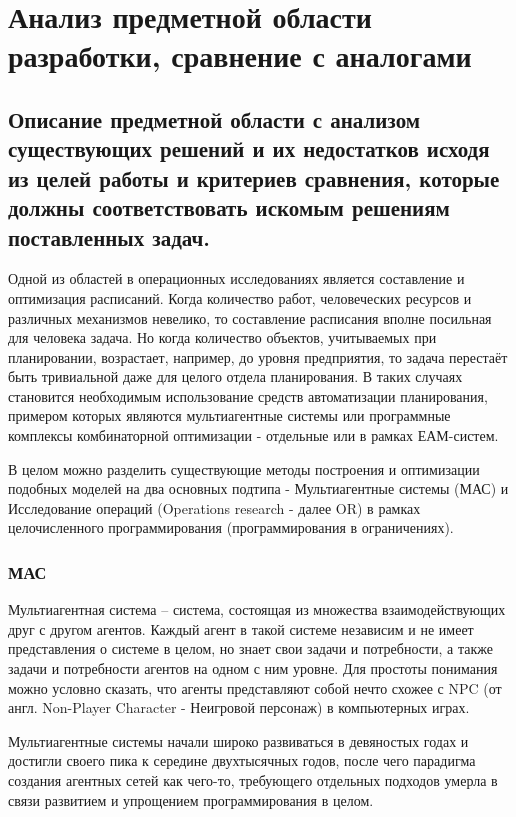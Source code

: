 \section{Анализ предметной области разработки, сравнение с аналогами}

\subsection{Описание предметной области с анализом существующих решений и их недостатков исходя из целей работы и критериев сравнения, которые должны соответствовать искомым решениям поставленных задач.}
Одной из областей в операционных исследованиях является составление и оптимизация расписаний. Когда количество работ, человеческих ресурсов и различных механизмов невелико, то составление расписания вполне посильная для человека задача. Но когда количество объектов, учитываемых при планировании, возрастает, например, до уровня предприятия, то задача перестаёт быть тривиальной даже для целого отдела планирования. В таких случаях становится необходимым использование средств автоматизации планирования, примером которых являются мультиагентные системы или программные комплексы комбинаторной оптимизации - отдельные или в рамках ЕАМ-систем.

В целом можно разделить существующие методы построения и оптимизации подобных моделей на два основных подтипа - Мультиагентные системы (МАС) и Исследование операций (Operations research - далее OR) в рамках целочисленного программирования (программирования в ограничениях).

\subsubsection{МАС}

Мультиагентная система – система, состоящая из множества взаимодействующих друг с другом агентов. Каждый агент в такой системе независим и не имеет представления о системе в целом, но знает свои задачи и потребности, а также задачи и потребности агентов на одном с ним уровне. Для простоты понимания можно условно сказать, что агенты представляют собой нечто схожее с NPC (от англ. Non-Player Character - Неигровой персонаж) в компьютерных играх.

Мультиагентные системы начали широко развиваться в девяностых годах и достигли своего пика к середине двухтысячных годов, после чего парадигма создания агентных сетей как чего-то, требующего отдельных подходов умерла в связи развитием и упрощением программирования в целом.

